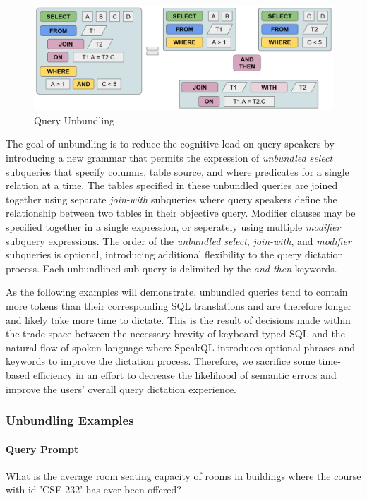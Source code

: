\begin{figure}[H]
  \centering
  \includegraphics[width=\linewidth]{figures/unbundling_1.png}
  \caption{Query Unbundling}
  \label{fig:unbundling}
\end{figure}

The goal of unbundling is to reduce the cognitive load on query speakers by introducing a new grammar that permits the expression of \emph{unbundled select} subqueries that specify columns, table source, and where predicates for a single relation at a time. The tables specified in these unbundled queries are joined together using separate \emph{join-with} subqueries where query speakers define the relationship between two tables in their objective query. Modifier clauses may be specified together in a single expression, or seperately using multiple \emph{modifier} subquery expressions. The order of the \emph{unbundled select}, \emph{join-with}, and \emph{modifier} subqueries is optional, introducing additional flexibility to the query dictation process. Each unbundlined sub-query is delimited by the \emph{and then} keywords.

As the following examples will demonstrate, unbundled queries tend to contain more tokens than their corresponding SQL translations and are therefore longer and likely take more time to dictate. This is the result of decisions made within the trade space between the necessary brevity of keyboard-typed SQL and the natural flow of spoken language where SpeakQL introduces optional phrases and keywords to improve the dictation process. Therefore, we sacrifice some time-based efficiency in an effort to decrease the likelihood of semantic errors and improve the users' overall query dictation experience. 

\subsubsection{Unbundling Examples}

\paragraph{Query Prompt} What is the average room seating capacity of rooms in buildings where the course with id 'CSE 232' has ever been offered? 

